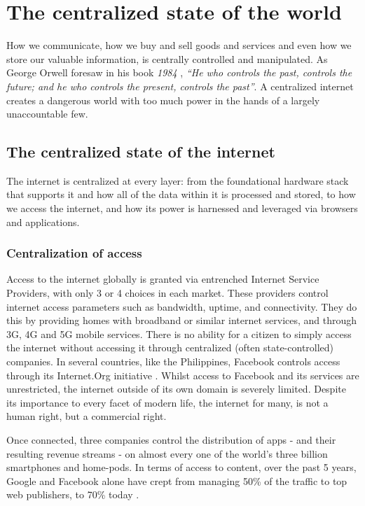 \section{The centralized state of the world}
\label{sec:intro}
How we communicate, how we buy and sell goods and services and even how we store our valuable information, is centrally controlled and manipulated. As George Orwell foresaw in his book \textit{1984} \cite{orwell2009nineteen}, \textit{``He who controls the past, controls the future; and he who controls the present, controls the past''}. A centralized internet creates a dangerous world with too much power in the hands of a largely unaccountable few. 


\subsection{The centralized state of the internet}
\label{sec:introInternet}
The internet is centralized at every layer: from the foundational hardware stack that supports it and how all of the data within it is processed and stored, to how we access the internet, and how its power is harnessed and leveraged via browsers and applications. 

\subsubsection{Centralization of access}
\label{sec:introaccess}
Access to the internet globally is granted via entrenched Internet Service Providers, with only 3 or 4 choices in each market. These providers control internet access parameters such as bandwidth, uptime, and connectivity. They do this by providing homes with broadband or similar internet services, and through 3G, 4G and 5G mobile services. There is no ability for a citizen to simply access the internet without accessing it through centralized (often state-controlled) companies. In several countries, like the Philippines, Facebook controls access through its Internet.Org initiative \cite{SoftpediaFace}. Whilst access to Facebook and its services are unrestricted, the internet outside of its own domain is severely limited. Despite its importance to every facet of modern life, the internet for many, is not a human right, but a commercial right. 

Once connected, three companies control the distribution of apps - and their resulting revenue streams - on almost every one of the world's three billion smartphones and home-pods. In terms of access to content, over the past 5 years, Google and Facebook alone have crept from managing 50\% of the traffic to top web publishers, to 70\% today \cite{Newsweek2017}. 

